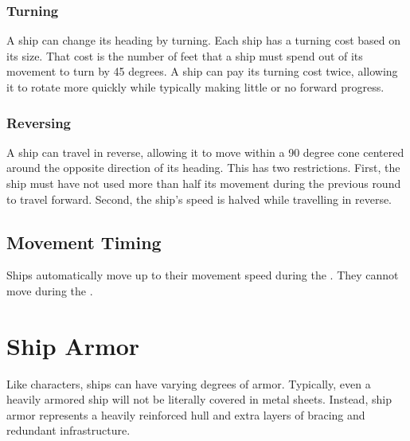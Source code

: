         \subsubsection{Turning}
            A ship can change its heading by turning.
            Each ship has a turning cost based on its size.
            That cost is the number of feet that a ship must spend out of its movement to turn by 45 degrees.
            A ship can pay its turning cost twice, allowing it to rotate more quickly while typically making little or no forward progress.

        \subsubsection{Reversing}
            A ship can travel in reverse, allowing it to move within a 90 degree cone centered around the opposite direction of its heading.
            This has two restrictions.
            First, the ship must have not used more than half its movement during the previous round to travel forward.
            Second, the ship's speed is halved while travelling in reverse.

    \subsection{Movement Timing}
        Ships automatically move up to their movement speed during the .
        They cannot move during the .

\section{Ship Armor}
    Like characters, ships can have varying degrees of armor.
    Typically, even a heavily armored ship will not be literally covered in metal sheets.
    Instead, ship armor represents a heavily reinforced hull and extra layers of bracing and redundant infrastructure.

